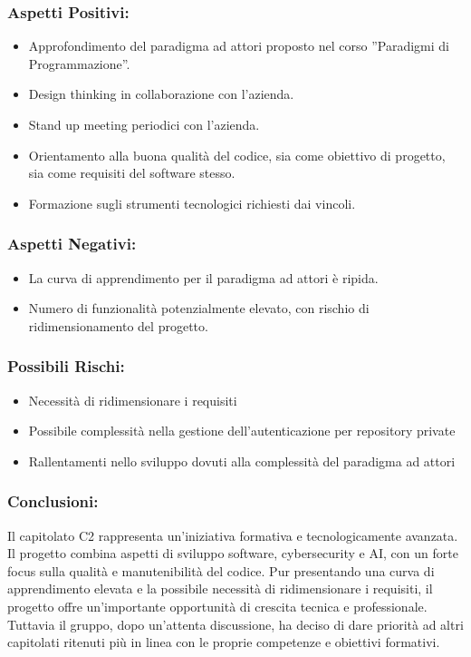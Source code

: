 \documentclass[a4paper,12pt]{article}
\begin{document}
\subsubsection*{Aspetti Positivi:}
\begin{itemize}
    \item Approfondimento del paradigma ad attori proposto nel corso ''Paradigmi di Programmazione''.
    \item Design thinking in collaborazione con l’azienda.
    \item Stand up meeting periodici con l'azienda.
    \item Orientamento alla buona qualità del codice, sia come obiettivo di progetto, sia come requisiti del software stesso.
    \item Formazione sugli strumenti tecnologici richiesti dai vincoli.
\end{itemize}

\subsubsection*{Aspetti Negativi:}
\begin{itemize}
    \item La curva di apprendimento per il paradigma ad attori è ripida.
    \item Numero di funzionalità potenzialmente elevato, con rischio di ridimensionamento del progetto.
\end{itemize}
\subsubsection*{Possibili Rischi:}
\begin{itemize}
    \item Necessità di ridimensionare i requisiti
    \item Possibile complessità nella gestione dell’autenticazione per repository private
    \item Rallentamenti nello sviluppo dovuti alla complessità del paradigma ad attori
\end{itemize}

\subsubsection*{Conclusioni:}
Il capitolato C2 rappresenta un’iniziativa formativa e tecnologicamente avanzata. Il progetto combina aspetti di sviluppo software, cybersecurity e AI, con un forte focus sulla qualità e manutenibilità del codice.
Pur presentando una curva di apprendimento elevata e la possibile necessità di ridimensionare i requisiti, il progetto offre un’importante opportunità di crescita tecnica e professionale. Tuttavia il gruppo, dopo un’attenta discussione, ha deciso di dare priorità ad altri capitolati ritenuti più in linea con le proprie competenze e obiettivi formativi.
\vspace{2.0cm}
\end{document}
